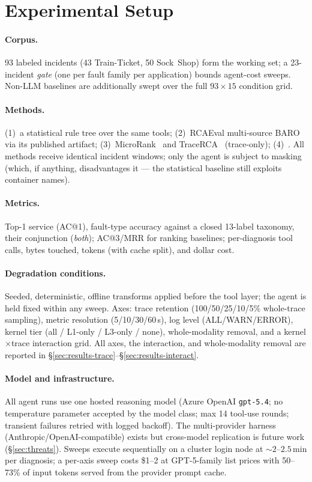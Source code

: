 \section{Experimental Setup}
\label{sec:setup}

\paragraph{Corpus.} 93 labeled incidents (43 Train-Ticket, 50 Sock~Shop) form the
working set; a 23-incident \emph{gate} (one per fault family per application) bounds
agent-cost sweeps. Non-LLM baselines are additionally swept over the full
$93\times15$ condition grid.

\paragraph{Methods.} (1)~a statistical rule tree over the same tools; (2)~RCAEval
multi-source BARO~\cite{pham2024baro,pham2025rcaeval} via its published artifact;
(3)~MicroRank~\cite{yu2021microrank} and TraceRCA~\cite{li2021tracerca} (trace-only);
(4)~\agent. All methods receive identical incident windows; only the agent is subject
to masking (which, if anything, disadvantages it --- the statistical baseline still
exploits container names).

\paragraph{Metrics.} Top-1 service (AC@1), fault-type accuracy against a closed
13-label taxonomy, their conjunction (\emph{both}); AC@3/MRR for ranking baselines;
per-diagnosis tool calls, bytes touched, tokens (with cache split), and dollar cost.

\paragraph{Degradation conditions.} Seeded, deterministic, offline transforms applied
before the tool layer; the agent is held fixed within any sweep. Axes: trace retention
(100/50/25/10/5\% whole-trace sampling), metric resolution (5/10/30/60\,s), log level
(ALL/WARN/ERROR), kernel tier (all / L1-only / L3-only / none), whole-modality
removal, and a kernel$\times$trace interaction grid. All axes, the interaction, and
whole-modality removal are reported in \S\ref{sec:results-trace}--\S\ref{sec:results-interact}.

\paragraph{Model and infrastructure.} All agent runs use one hosted reasoning model
(Azure OpenAI \texttt{gpt-5.4}; no temperature parameter accepted by the model class;
max 14 tool-use rounds; transient failures retried with logged backoff). The
multi-provider harness (Anthropic/OpenAI-compatible) exists but cross-model
replication is future work (\S\ref{sec:threats}). Sweeps execute sequentially on a
cluster login node at ${\sim}2$--$2.5$\,min per diagnosis; a per-axis sweep costs
\$1--2 at GPT-5-family list prices with 50--73\% of input tokens served from the
provider prompt cache. 

